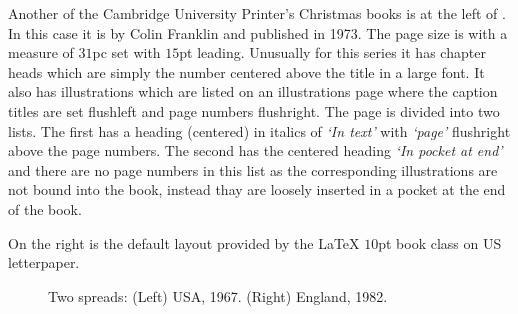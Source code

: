 \documentclass[10pt,a4paper,oneside,extrafontsizes]{memoir}%
\begin{document}
\begin{paracol}{2}
\switchEng
Another of the Cambridge University Printer's Christmas books is at the left of
. In this case it is  by Colin Franklin and published in 1973. The
page size is  with a measure of $31$pc set with
$15$pt leading.  Unusually for this series it has chapter
heads which are simply the number centered above
the title in a large font. It also has
illustrations which are listed on an illustrations
page where the caption titles are set flushleft and
page numbers flushright. The page is divided into two lists. The first
has a heading (centered) in italics of \textit{`In text'} with
\textit{`page'} flushright above the page numbers.  The second has the
centered heading \textit{`In pocket at end'} and there are no page
numbers in this list as the corresponding illustrations are not bound
into the book, instead thay are loosely inserted in a pocket at the
end of the book.

On the right is the default layout provided by the
LaTeX $10$pt book class on US letterpaper.
\end{paracol}

\begin{figure}
\centering
\begin{minipage}[b]{\pwlayi}
\end{minipage}
\hfill
\begin{minipage}[b]{\pwlayi}
\end{minipage}
\caption[Two spreads: USA, 1967 and England, 1982]%
        {Two spreads: (Left) USA, 1967.
         (Right) England, 1982.} \label{fb:14}
\end{figure}
\end{document}
